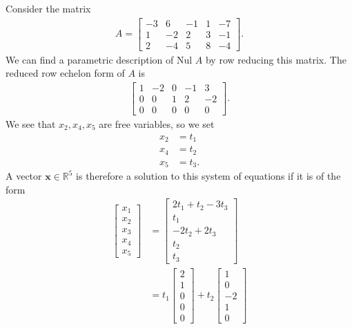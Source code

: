 \documentclass[12pt,letterpaper,reqno]{article}
\numberwithin{equation}{section}
\newcommand{\R}{\ensuremath{\mathbb R}}
\newcommand{\bx}{\mathbf{x}}
\newcommand{\Nul}{\text{Nul }}
\begin{document}
\begin{example}
Consider the matrix
\begin{align*}
	A=\begin{bmatrix}
		-3 & 6 & -1 & 1 & -7 \\
		1 & -2 & 2 & 3 & -1 \\
		2 & -4 & 5 & 8 & -4
	\end{bmatrix}.
\end{align*}	
We can find a parametric description of $\Nul A$ by row reducing this matrix. The reduced row echelon form of $A$ is 
\begin{align*}
	\begin{bmatrix}
		1 & -2 & 0 & -1 & 3 \\
		0 & 0 & 1 & 2 & -2 \\
		0 & 0 & 0 & 0 & 0
	\end{bmatrix}.
\end{align*}
We see that $x_2, x_4, x_5$ are free variables, so we set
\begin{align*}
	x_2&=t_1 \\
	x_4&=t_2 \\
	x_5&=t_3. 	
\end{align*}
A vector $\bx \in \R^5$ is therefore a solution to this system of equations if it is of the form
\begin{align*}
	\begin{bmatrix}
		x_1 \\ x_2 \\ x_3 \\ x_4 \\ x_5
	\end{bmatrix}&=\begin{bmatrix}
		2t_1+t_2-3t_3 \\
		t_1 \\
		-2t_2+2t_3 \\
		t_2 \\
		t_3
	\end{bmatrix} \\
	&=t_1\begin{bmatrix}
		2 \\ 1 \\ 0 \\ 0 \\0
	\end{bmatrix}+t_2\begin{bmatrix}
		1 \\ 0 \\ -2 \\ 1 \\0

\end{bmatrix}
\end{align*}
\end{example}
\end{document}
